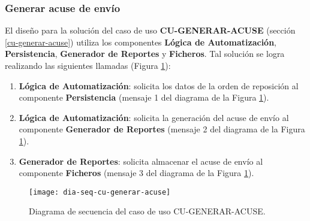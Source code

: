 \subsubsection{Generar acuse de envío}
El diseño para la solución del caso de uso \textbf{CU-GENERAR-ACUSE} (sección \ref{cu-generar-acuse}) utiliza los componentes \textbf{Lógica de Automatización}, \textbf{Persistencia}, \textbf{Generador de Reportes} y \textbf{Ficheros}. Tal solución se logra realizando las siguientes llamadas (Figura \ref{fig:dia-seq-cu-generar-acuse}):
\begin{enumerate}
	\item \textbf{Lógica de Automatización}: solicita los datos de la orden de reposición al componente \textbf{Persistencia} (mensaje 1 del diagrama de la Figura \ref{fig:dia-seq-cu-generar-acuse}).
	\item \textbf{Lógica de Automatización}: solicita la generación del acuse de envío al componente \textbf{Generador de Reportes} (mensaje 2 del diagrama de la Figura \ref{fig:dia-seq-cu-generar-acuse}).
	\item \textbf{Generador de Reportes}: solicita almacenar el acuse de envío al componente \textbf{Ficheros} (mensaje 3 del diagrama de la Figura \ref{fig:dia-seq-cu-generar-acuse}).
\end{enumerate}
\begin{figure}[h]
	\centering
	\texttt{[image: dia-seq-cu-generar-acuse]}
	\caption{Diagrama de secuencia del caso de uso CU-GENERAR-ACUSE.}
	\label{fig:dia-seq-cu-generar-acuse}
\end{figure}
